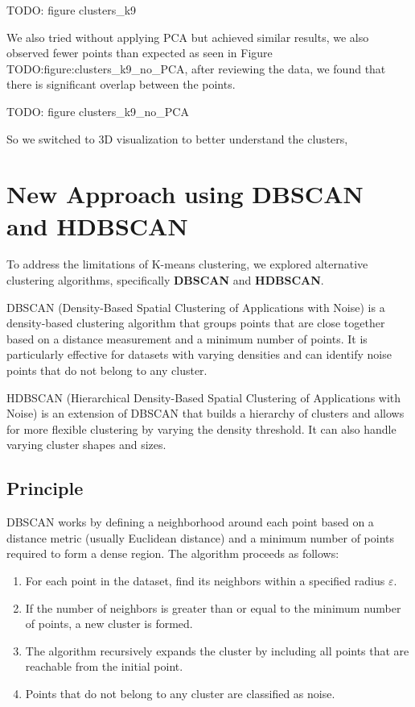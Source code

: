 TODO: figure clusters_k9

We also tried without applying PCA but achieved similar results, we also observed fewer points than expected as seen in
Figure {TODO:figure:clusters_k9_no_PCA}, after reviewing the data, we found that there is significant overlap between the points.

TODO: figure clusters_k9_no_PCA

So we switched to 3D visualization to better understand the clusters,

\section{New Approach using DBSCAN and HDBSCAN}
\label{subsec:new_approach_dbscan_hdbscan}

To address the limitations of K-means clustering, we explored alternative clustering algorithms, specifically
\textbf{DBSCAN} and \textbf{HDBSCAN}.

DBSCAN (Density-Based Spatial Clustering of Applications with Noise) is a density-based clustering algorithm that
groups points that are close together based on a distance measurement and a minimum number of points. It is particularly
effective for datasets with varying densities and can identify noise points that do not belong to any cluster.

HDBSCAN (Hierarchical Density-Based Spatial Clustering of Applications with Noise) is an extension of DBSCAN that builds
a hierarchy of clusters and allows for more flexible clustering by varying the density threshold. It can also handle varying
cluster shapes and sizes.

\subsection{Principle}
\label{subsec:principle_dbscan_hdbscan}

\label{subsubsec:dbscan}

DBSCAN works by defining a neighborhood around each point based on a distance metric (usually Euclidean distance) and a
minimum number of points required to form a dense region. The algorithm proceeds as follows:

\begin{enumerate}
	\item For each point in the dataset, find its neighbors within a specified radius $\varepsilon$.
	\item If the number of neighbors is greater than or equal to the minimum number of points, a new cluster is formed.
	\item The algorithm recursively expands the cluster by including all points that are reachable from the initial point.
	\item Points that do not belong to any cluster are classified as noise.
\end{enumerate}

